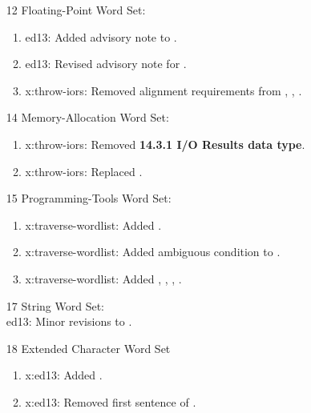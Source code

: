 \begin{itemize}
	\item[12] Floating-Point Word Set:			%
		\begin{enumerate}
		\item \textsf{ed13}: Added advisory note to .
		\item \textsf{ed13}: Revised advisory note for .
		\item \textsf{x:throw-iors}: Removed alignment requirements from
			,
			,
			.
		\end{enumerate}

	\item[14] Memory-Allocation Word Set:		%
		\begin{enumerate}
		\item \textsf{x:throw-iors}: Removed \textbf{14.3.1 I/O Results data type}.
		\item \textsf{x:throw-iors}: Replaced .
		\end{enumerate}

	\item[15] Programming-Tools Word Set:		%
		\begin{enumerate}
		\item \textsf{x:traverse-wordlist}: Added .
		\item \textsf{x:traverse-wordlist}: Added ambiguous condition to .
		\item \textsf{x:traverse-wordlist}: Added
			,
			,
			,
			.
		\end{enumerate}

	\item[17] String Word Set:						%
		~ \\
		\textsf{ed13}: Minor revisions to .

	\item[18] Extended Character Word Set		%
		\begin{enumerate}
		\item \textsf{x:ed13}: Added .
		\item \textsf{x:ed13}: Removed first sentence of .
		\end{enumerate}


\end{itemize}
